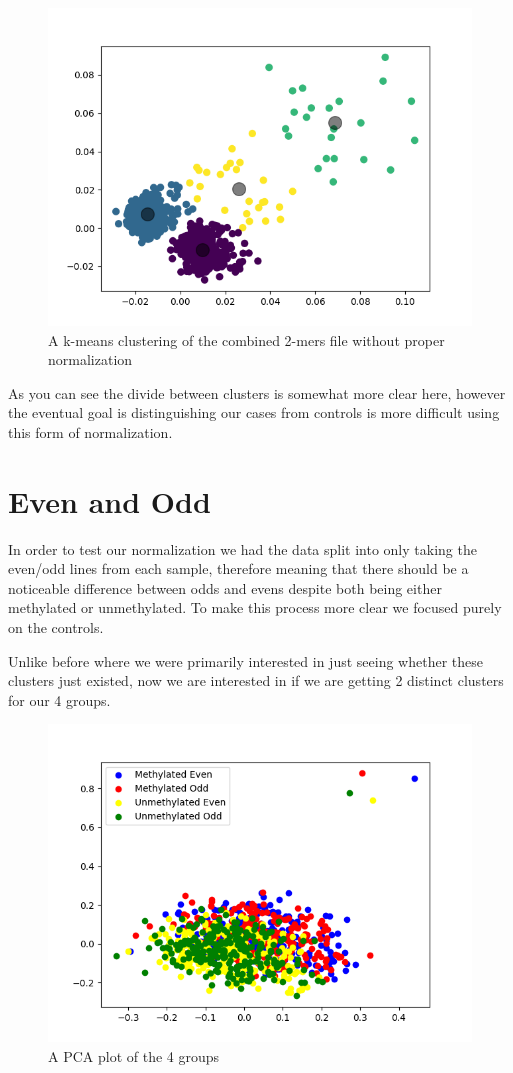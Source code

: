 \begin{figure}[H]
	\centering
	\includegraphics[width=0.7\linewidth]{../../figures/exploration/without_background/combined_2mers.png}
	\caption{A k-means clustering of the combined 2-mers file without proper normalization}
	\label{fig:kmeans1}
\end{figure}

As you can see the divide between clusters is somewhat more clear here, however the eventual goal is distinguishing our cases from controls is more difficult using this form of normalization.

\section{Even and Odd}
In order to test our normalization we had the data split into only taking the even/odd lines from each sample, therefore meaning that there should be a noticeable difference between odds and evens despite both being either methylated or unmethylated. To make this process more clear we focused purely on the controls. 

Unlike before where we were primarily interested in just seeing whether these clusters just existed, now we are interested in if we are getting 2 distinct clusters for our 4 groups. 

\begin{figure}[H]
	\centering
	\includegraphics[width=0.7\linewidth]{../../figures/exploration/all_healthy/all_healthy.png}
	\caption{A PCA plot of the 4 groups}
	\label{fig:allhealthy0}
\end{figure}

